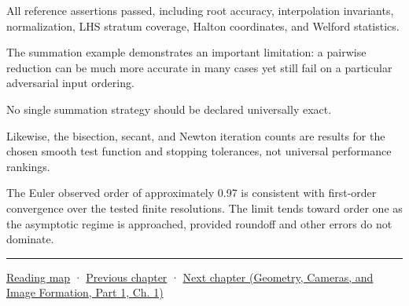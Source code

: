 All reference assertions passed, including root accuracy, interpolation invariants, normalization, LHS stratum coverage, Halton coordinates, and Welford statistics.

The summation example demonstrates an important limitation: a pairwise reduction can be much more accurate in many cases yet still fail on a particular adversarial input ordering.

No single summation strategy should be declared universally exact.

Likewise, the bisection, secant, and Newton iteration counts are results for the chosen smooth test function and stopping tolerances, not universal performance rankings.

The Euler observed order of approximately 0.97 is consistent with first-order convergence over the tested finite resolutions. The limit tends toward order one as the asymptotic regime is approached, provided roundoff and other errors do not dominate.

\begin{center}\rule{0.5\linewidth}{0.5pt}\end{center}

\hyperref[volume-reading-map]{Reading map} · \hyperref[02-foundations-ii-ch030-monte-carlo-estimates-and-uncertainty-metrics]{Previous chapter} · \href{../03-Geometry-Cameras-and-Image-Formation-P01/main.pdf\#nameddest=02-foundations-ii-ch032-geometry-becomes-an-image-and-an-inverse-problem}{Next chapter (Geometry, Cameras, and Image Formation, Part 1, Ch. 1)}
